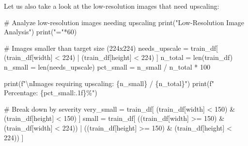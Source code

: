 \documentclass[
  letterpaper,
  DIV=11,
  numbers=noendperiod]{scrartcl}
\newenvironment{Shaded}{\begin{snugshade}}{\end{snugshade}}
\newcommand{\BuiltInTok}[1]{\textcolor[rgb]{0.00,0.23,0.31}{#1}}
\newcommand{\CharTok}[1]{\textcolor[rgb]{0.13,0.47,0.30}{#1}}
\newcommand{\CommentTok}[1]{\textcolor[rgb]{0.37,0.37,0.37}{#1}}
\newcommand{\DecValTok}[1]{\textcolor[rgb]{0.68,0.00,0.00}{#1}}
\newcommand{\NormalTok}[1]{\textcolor[rgb]{0.00,0.23,0.31}{#1}}
\newcommand{\OperatorTok}[1]{\textcolor[rgb]{0.37,0.37,0.37}{#1}}
\newcommand{\SpecialCharTok}[1]{\textcolor[rgb]{0.37,0.37,0.37}{#1}}
\newcommand{\SpecialStringTok}[1]{\textcolor[rgb]{0.13,0.47,0.30}{#1}}
\newcommand{\StringTok}[1]{\textcolor[rgb]{0.13,0.47,0.30}{#1}}
\renewenvironment{Shaded}{%
  \begin{tcolorbox}[%
    enhanced,%
    colback=codebg,%
    colframe=codebg,%
    borderline west={3pt}{0pt}{sectionblue},%
    boxrule=0pt,%
    arc=0pt,%
    boxsep=5pt,%
    left=2mm,%
    right=2mm,%
    top=2mm,%
    bottom=2mm%
  ]%
}{%
  \end{tcolorbox}%
}
\begin{document}
Let us also take a look at the low-resolution images that need
upscaling:

\begin{Shaded}
\begin{Highlighting}[]
\CommentTok{\# Analyze low{-}resolution images needing upscaling}
\BuiltInTok{print}\NormalTok{(}\StringTok{"Low{-}Resolution Image Analysis"}\NormalTok{)}
\BuiltInTok{print}\NormalTok{(}\StringTok{"="}\OperatorTok{*}\DecValTok{60}\NormalTok{)}

\CommentTok{\# Images smaller than target size (224x224)}
\NormalTok{needs\_upscale }\OperatorTok{=}\NormalTok{ train\_df[}
\NormalTok{    (train\_df[}\StringTok{\textquotesingle{}width\textquotesingle{}}\NormalTok{] }\OperatorTok{\textless{}} \DecValTok{224}\NormalTok{) }\OperatorTok{|}\NormalTok{ (train\_df[}\StringTok{\textquotesingle{}height\textquotesingle{}}\NormalTok{] }\OperatorTok{\textless{}} \DecValTok{224}\NormalTok{)}
\NormalTok{]}
\NormalTok{n\_total }\OperatorTok{=} \BuiltInTok{len}\NormalTok{(train\_df)}
\NormalTok{n\_small }\OperatorTok{=} \BuiltInTok{len}\NormalTok{(needs\_upscale)}
\NormalTok{pct\_small }\OperatorTok{=}\NormalTok{ n\_small }\OperatorTok{/}\NormalTok{ n\_total }\OperatorTok{*} \DecValTok{100}

\BuiltInTok{print}\NormalTok{(}\SpecialStringTok{f"}\CharTok{\textbackslash{}n}\SpecialStringTok{Images requiring upscaling: }\SpecialCharTok{\{}\NormalTok{n\_small}\SpecialCharTok{\}}\SpecialStringTok{ / }\SpecialCharTok{\{}\NormalTok{n\_total}\SpecialCharTok{\}}\SpecialStringTok{"}\NormalTok{)}
\BuiltInTok{print}\NormalTok{(}\SpecialStringTok{f"  Percentage: }\SpecialCharTok{\{}\NormalTok{pct\_small}\SpecialCharTok{:.1f\}}\SpecialStringTok{\%"}\NormalTok{)}

\CommentTok{\# Break down by severity}
\NormalTok{very\_small }\OperatorTok{=}\NormalTok{ train\_df[}
\NormalTok{    (train\_df[}\StringTok{\textquotesingle{}width\textquotesingle{}}\NormalTok{] }\OperatorTok{\textless{}} \DecValTok{150}\NormalTok{) }\OperatorTok{\&}\NormalTok{ (train\_df[}\StringTok{\textquotesingle{}height\textquotesingle{}}\NormalTok{] }\OperatorTok{\textless{}} \DecValTok{150}\NormalTok{)}
\NormalTok{]}
\NormalTok{small }\OperatorTok{=}\NormalTok{ train\_df[}
\NormalTok{    ((train\_df[}\StringTok{\textquotesingle{}width\textquotesingle{}}\NormalTok{] }\OperatorTok{\textgreater{}=} \DecValTok{150}\NormalTok{) }\OperatorTok{\&}\NormalTok{ (train\_df[}\StringTok{\textquotesingle{}width\textquotesingle{}}\NormalTok{] }\OperatorTok{\textless{}} \DecValTok{224}\NormalTok{)) }\OperatorTok{|}
\NormalTok{    ((train\_df[}\StringTok{\textquotesingle{}height\textquotesingle{}}\NormalTok{] }\OperatorTok{\textgreater{}=} \DecValTok{150}\NormalTok{) }\OperatorTok{\&}\NormalTok{ (train\_df[}\StringTok{\textquotesingle{}height\textquotesingle{}}\NormalTok{] }\OperatorTok{\textless{}} \DecValTok{224}\NormalTok{))}
\NormalTok{]}


\end{Highlighting}
\end{Shaded}
\end{document}
